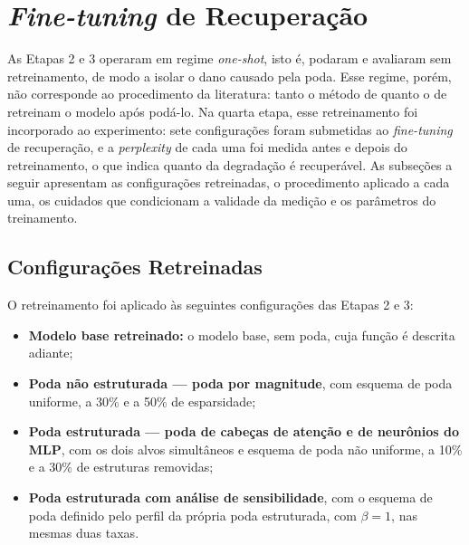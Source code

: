 \section{\textit{Fine-tuning} de Recuperação}\label{sec:finetuning}


As Etapas 2 e 3 operaram em regime \textit{one-shot}, isto é, podaram e avaliaram sem
retreinamento, de modo a isolar o dano causado pela poda. Esse regime, porém, não
corresponde ao procedimento da literatura: tanto o método de 
quanto o de  retreinam o modelo após podá-lo. Na quarta etapa, esse retreinamento
foi incorporado ao experimento: sete configurações foram submetidas ao \textit{fine-tuning}
de recuperação, e a \textit{perplexity} de cada uma foi medida antes e depois do
retreinamento, o que indica quanto da degradação é recuperável. As subseções a seguir
apresentam as configurações retreinadas, o procedimento aplicado a cada uma, os cuidados
que condicionam a validade da medição e os parâmetros do treinamento.

\subsection{Configurações Retreinadas}\label{subsec:ft_configuracoes}

O retreinamento foi aplicado às seguintes configurações das Etapas 2 e 3:

\begin{itemize}
    \item \textbf{Modelo base retreinado:} o modelo base, sem poda, cuja função é
          descrita adiante;
    \item \textbf{Poda não estruturada --- poda por magnitude}, com esquema de poda uniforme, a
          30\% e a 50\% de esparsidade;
    \item \textbf{Poda estruturada --- poda de cabeças de atenção e de neurônios do MLP},
          com os dois alvos simultâneos e esquema de poda não uniforme, a 10\% e a 30\% de estruturas
          removidas;
    \item \textbf{Poda estruturada com análise de sensibilidade}, com o esquema de poda definido
          pelo perfil da própria poda estruturada, com $\beta = 1$, nas mesmas duas taxas.
\end{itemize}

